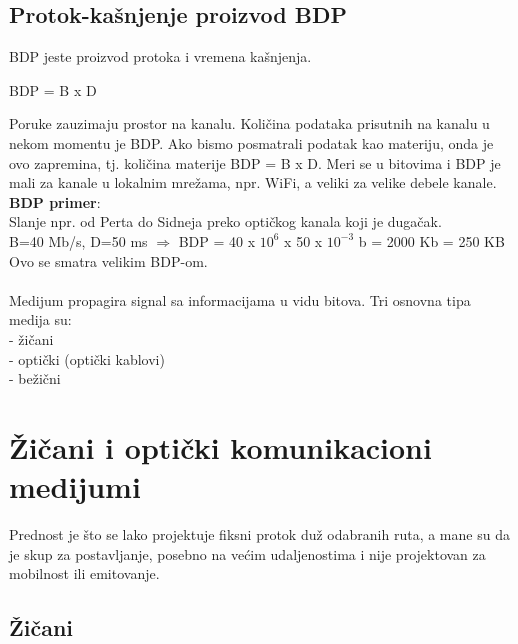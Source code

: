 \documentclass{article} %
\begin{document}
\subsection{Protok-kašnjenje proizvod BDP}
BDP jeste proizvod protoka i vremena kašnjenja.
                     \begin{center}
                       BDP = B x D
                      \end{center}
Poruke zauzimaju prostor na kanalu. Količina podataka prisutnih na kanalu u nekom momentu je BDP. Ako bismo posmatrali podatak kao materiju, onda je ovo zapremina, tj. količina materije BDP = B x D. Meri se u bitovima i BDP je mali za kanale u lokalnim mrežama, npr. WiFi, a veliki za velike debele kanale.\\
\textbf{BDP primer}:\\
Slanje npr. od Perta do Sidneja preko optičkog kanala koji je dugačak.\\
B=40 Mb/s, D=50 ms $ \Rightarrow $ BDP = 40 x $10^{6}$ x 50 x $10^{-3}$ b = 2000 Kb = 250 KB\\
Ovo se smatra velikim BDP-om.\\
\\
Medijum propagira signal sa informacijama u vidu bitova. Tri osnovna tipa medija su: \\
- žičani\\
- optički (optički kablovi)\\
- bežični

\section{Žičani i optički komunikacioni medijumi}
Prednost je što se lako projektuje fiksni protok duž odabranih ruta, a mane su da je skup za postavljanje, posebno na većim udaljenostima i nije projektovan za mobilnost ili emitovanje.
\subsection{Žičani}
\end{document}
